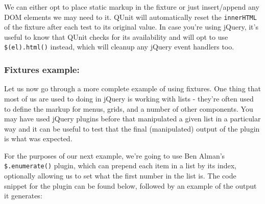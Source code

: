 \documentclass[9pt]{book}
\begin{document}
We can either opt to place static markup in the fixture or just
insert/append any DOM elements we may need to it. QUnit will
automatically reset the \texttt{innerHTML} of the fixture after each
test to its original value. In case you're using jQuery, it's useful to
know that QUnit checks for its availability and will opt to use
\texttt{\$(el).html()} instead, which will cleanup any jQuery event
handlers too.

\subsubsection{Fixtures example:}\label{fixtures-example}

Let us now go through a more complete example of using fixtures. One
thing that most of us are used to doing in jQuery is working with lists
- they're often used to define the markup for menus, grids, and a number
of other components. You may have used jQuery plugins before that
manipulated a given list in a particular way and it can be useful to
test that the final (manipulated) output of the plugin is what was
expected.

For the purposes of our next example, we're going to use Ben Alman's
\texttt{\$.enumerate()} plugin, which can prepend each item in a list by
its index, optionally allowing us to set what the first number in the
list is. The code snippet for the plugin can be found below, followed by
an example of the output it generates:
\end{document}
